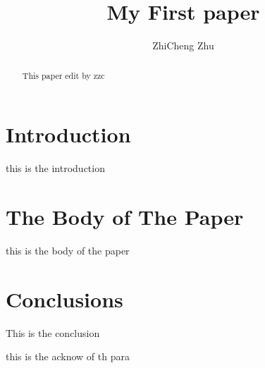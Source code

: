 \documentclass[sigconf]{acmart}
\begin{document}
\title{My First paper}


\author{ZhiCheng Zhu}



\begin{abstract}
This paper edit by zzc
\end{abstract}



\maketitle

\section{Introduction}

this is the introduction

\section{The Body of The Paper}

this is the body of the paper



\section{Conclusions}

This is the conclusion



\appendix








\begin{acks}

  this is the acknow of th para

\end{acks}


 
\end{document}
